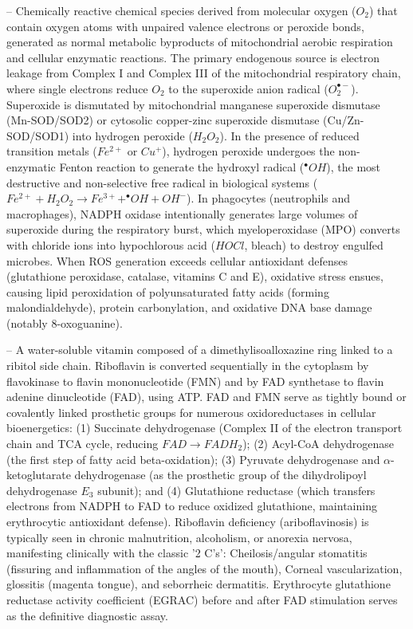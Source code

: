 -- Chemically reactive chemical species derived from molecular oxygen ($O_2$) that contain oxygen atoms with unpaired valence electrons or peroxide bonds, generated as normal metabolic byproducts of mitochondrial aerobic respiration and cellular enzymatic reactions. The primary endogenous source is electron leakage from Complex I and Complex III of the mitochondrial respiratory chain, where single electrons reduce $O_2$ to the superoxide anion radical ($O_2^{\bullet-}$). Superoxide is dismutated by mitochondrial manganese superoxide dismutase (Mn-SOD/SOD2) or cytosolic copper-zinc superoxide dismutase (Cu/Zn-SOD/SOD1) into hydrogen peroxide ($H_2O_2$). In the presence of reduced transition metals ($Fe^{2+}$ or $Cu^+$), hydrogen peroxide undergoes the non-enzymatic Fenton reaction to generate the hydroxyl radical ($^{\bullet}OH$), the most destructive and non-selective free radical in biological systems ($Fe^{2+} + H_2O_2 \to Fe^{3+} + ^{\bullet}OH + OH^-$). In phagocytes (neutrophils and macrophages), NADPH oxidase intentionally generates large volumes of superoxide during the respiratory burst, which myeloperoxidase (MPO) converts with chloride ions into hypochlorous acid ($HOCl$, bleach) to destroy engulfed microbes. When ROS generation exceeds cellular antioxidant defenses (glutathione peroxidase, catalase, vitamins C and E), oxidative stress ensues, causing lipid peroxidation of polyunsaturated fatty acids (forming malondialdehyde), protein carbonylation, and oxidative DNA base damage (notably 8-oxoguanine).

-- A water-soluble vitamin composed of a dimethylisoalloxazine ring linked to a ribitol side chain. Riboflavin is converted sequentially in the cytoplasm by flavokinase to flavin mononucleotide (FMN) and by FAD synthetase to flavin adenine dinucleotide (FAD), using ATP. FAD and FMN serve as tightly bound or covalently linked prosthetic groups for numerous oxidoreductases in cellular bioenergetics: (1) Succinate dehydrogenase (Complex II of the electron transport chain and TCA cycle, reducing $FAD \to FADH_2$); (2) Acyl-CoA dehydrogenase (the first step of fatty acid beta-oxidation); (3) Pyruvate dehydrogenase and $\alpha$-ketoglutarate dehydrogenase (as the prosthetic group of the dihydrolipoyl dehydrogenase $E_3$ subunit); and (4) Glutathione reductase (which transfers electrons from NADPH to FAD to reduce oxidized glutathione, maintaining erythrocytic antioxidant defense). Riboflavin deficiency (ariboflavinosis) is typically seen in chronic malnutrition, alcoholism, or anorexia nervosa, manifesting clinically with the classic '2 C's': Cheilosis/angular stomatitis (fissuring and inflammation of the angles of the mouth), Corneal vascularization, glossitis (magenta tongue), and seborrheic dermatitis. Erythrocyte glutathione reductase activity coefficient (EGRAC) before and after FAD stimulation serves as the definitive diagnostic assay.

